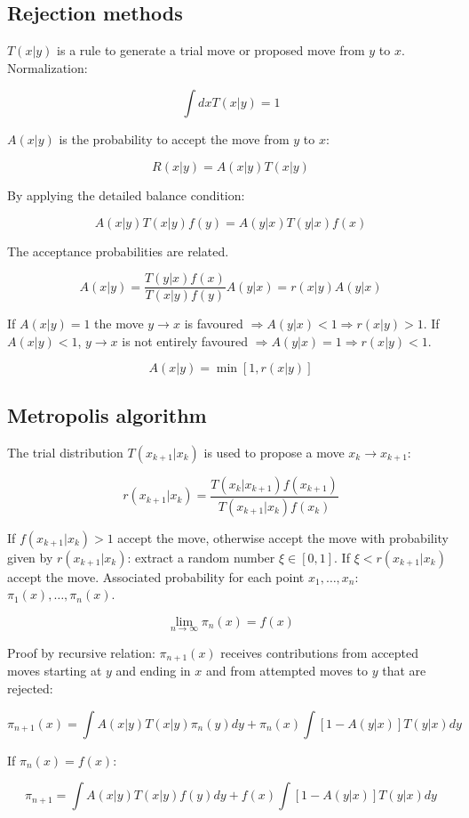 	\subsection{Rejection methods}
	$T(x|y)$ is a rule to generate a trial move or proposed move from $y$ to $x$.
	Normalization:

	$$\int dxT(x|y) = 1$$

	$A(x|y)$ is the probability to accept the move from $y$ to $x$:

	$$R(x|y) = A(x|y)T(x|y)$$

	By applying the detailed balance condition:

	$$A(x|y)T(x|y)f(y) = A(y|x)T(y|x)f(x)$$

	The acceptance probabilities are related.

	$$A(x|y) = \frac{T(y|x)f(x)}{T(x|y)f(y)}A(y|x) = r(x|y)A(y|x)$$

	If $A(x|y) = 1$ the move $y\rightarrow x$ is favoured $\Rightarrow A(y|x)< 1 \Rightarrow r(x|y)>1$.
	If $A(x|y) < 1$, $y\rightarrow x$ is not entirely favoured $\Rightarrow A(y|x) = 1\Rightarrow r(x|y) < 1$.

	$$A(x|y) = \min[1, r(x|y)]$$

	\subsection{Metropolis algorithm}
	The trial distribution $T(x_{k+1}|x_k)$ is used to propose a move $x_k\rightarrow x_{k+1}$:

	$$r(x_{k+1}|x_k) = \frac{T(x_k|x_{k+1})f(x_{k+1})}{T(x_{k+1}|x_k)f(x_k)}$$

	If $f(x_{k+1}|x_k)>1$ accept the move, otherwise accept the move with probability given by $r(x_{k+1}|x_k)$: extract a random number $\xi\in[0,1]$.
	If $\xi< r(x_{k+1}|x_k)$ accept the move.
	Associated probability for each point $x_1, \dots, x_n$: $\pi_1(x), \dots, \pi_n(x)$.

	$$\lim\limits_{n\rightarrow\infty}\pi_n(x) = f(x)$$

	Proof by recursive relation: $\pi_{n+1}(x)$ receives contributions from accepted moves starting at $y$ and ending in $x$ and from attempted moves to $y$ that are rejected:

	$$\pi_{n+1}(x) = \int A(x|y)T(x|y)\pi_n(y)dy + \pi_n(x)\int[1-A(y|x)]T(y|x)dy$$

	If $\pi_n(x) = f(x)$:

	$$\pi_{n+1} = \int A(x|y)T(x|y)f(y)dy + f(x)\int[1-A(y|x)]T(y|x)dy$$


